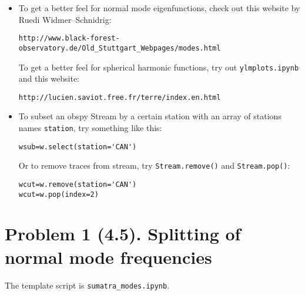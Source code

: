\documentclass[11pt,titlepage,fleqn]{article}
\begin{document}
\begin{spacing}{1.0}
\begin{itemize}
\begin{itemize}

\end{itemize}


\item To get a better feel for normal mode eigenfunctions, check out this website by Ruedi Widmer--Schnidrig:
%
\begin{verbatim}
http://www.black-forest-observatory.de/Old_Stuttgart_Webpages/modes.html
\end{verbatim}
%
To get a better feel for spherical harmonic functions, try out \verb+ylmplots.ipynb+ and this website:
%
\begin{verbatim}
http://lucien.saviot.free.fr/terre/index.en.html
\end{verbatim}


\item To subset an obspy Stream by a certain station with an array of stations names \verb+station+, try something like this:
%
\begin{verbatim}
wsub=w.select(station='CAN')
\end{verbatim}

Or to remove traces from stream, try \verb+Stream.remove()+ and \verb+Stream.pop()+:

\begin{verbatim}
wcut=w.remove(station='CAN')
wcut=w.pop(index=2)     
\end{verbatim}
%

\end{itemize}

\end{spacing}


\section*{Problem 1 (4.5). Splitting of normal mode frequencies}

The template script is \verb+sumatra_modes.ipynb+.
\end{document}

